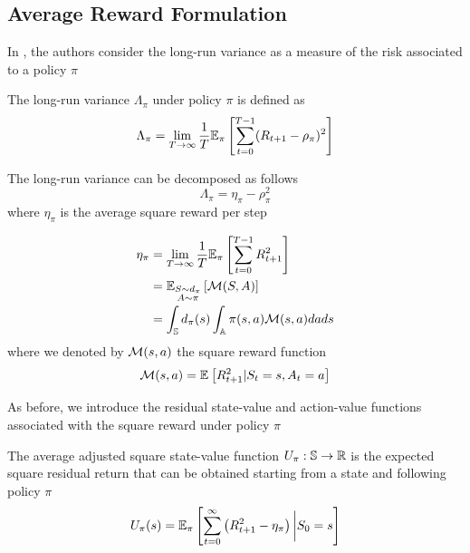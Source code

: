\subsection{Average Reward Formulation}
In \cite{prashanth2014actor}, the authors consider the long-run variance as a measure of the risk associated to a policy $\pi$
\begin{definition}
	The long-run variance $\Lambda_\pi$ under policy $\pi$ is defined as
	\begin{equation}
		\begin{split}
			\Lambda_\pi &= \lim_{T \to \infty} \frac{1}{T} \E[\pi]{
			\sum^{T-1}_{t=0} (R_{t+1} - \rho_\pi)^2}\\
		\end{split}
	\end{equation}
\end{definition}
The long-run variance can be decomposed as follows
\begin{equation}
	\Lambda_\pi = \eta_\pi - \rho_\pi^2 
\end{equation}
where $\eta_\pi$ is the average square reward per step  
\begin{definition}
	\begin{equation}
		\begin{split}
			\eta_\pi &= \lim_{T\to\infty}\frac{1}{T}\E[\pi]{\sum_{t=0}^{T-1} R_{t+1}^2}\\
					 &= \E[\substack{S\sim d_\pi \\ A \sim \pi}]{\calM(S,A)}\\	
					 &= \int_\S d_\pi(s) \int_\A \pi(s,a) \calM(s,a) da ds\\
		\end{split}
	\end{equation}
	where we denoted by $\calM(s,a)$ the square reward function
	\begin{equation}
		\calM(s,a) = \E{R_{t+1}^2 | S_t = s, A_t = a}
	\end{equation}
\end{definition}
As before, we introduce the residual state-value and action-value functions 
associated with the square reward under policy $\pi$
\begin{definition}
	The average adjusted square state-value function $U_\pi : \S \to \R$ is the
	expected square residual return that can be obtained starting from a state 
	and following policy $\pi$
	\begin{equation}
		U_\pi(s) = \E[\pi]{\sum^{\infty}_{t=0} \left(R_{t+1}^2 - \eta_\pi\right)
		\bigg| S_0 = s}
	\end{equation}
\end{definition}
